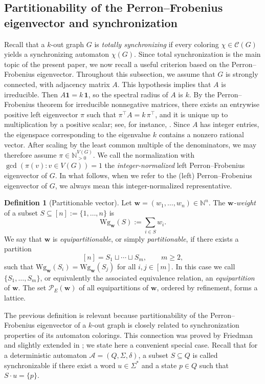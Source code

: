 \documentclass[a4paper,10pt]{amsart}
\theoremstyle{plain}
\theoremstyle{definition}
\newtheorem{definition}[theorem]{Definition}
\begin{document}
\subsection{Partitionability of the Perron--Frobenius eigenvector and synchronization}
Recall that a $k$-out graph $G$ is \emph{totally synchronizing} if every coloring $\chi\in\mathcal C(G)$ yields a synchronizing automaton $\chi(G)$. Since total synchronization is the main topic of the present paper, we now recall a useful criterion based on the Perron--Frobenius eigenvector. Throughout this subsection, we assume that $G$ is strongly connected, with adjacency matrix $A$. This hypothesis implies that $A$ is irreducible. Then $A\mathbf 1 = k\,\mathbf 1$, so the spectral radius of $A$ is $k$. By the Perron--Frobenius theorem for irreducible nonnegative matrices, there exists an entrywise positive left eigenvector $\pi$ such that $\pi^{\top}A = k\,\pi^{\top}$, and it is unique up to multiplication by a positive scalar; see, for instance, \cite{Seneta}. Since $A$ has integer entries, the eigenspace corresponding to the eigenvalue $k$ contains a nonzero rational vector. After scaling by the least common multiple of the denominators, we may therefore assume $\pi\in \mathbb N_{>0}^{V(G)}$. We call the normalization with $\gcd(\pi(v):v\in V(G))=1$ the \emph{integer-normalized} left Perron--Frobenius eigenvector of $G$. In what follows, when we refer to the (left) Perron--Frobenius eigenvector of $G$, we always mean this integer-normalized representative.

\begin{definition}[Partitionable vector]
Let $\mathbf w=(w_1,\dots,w_n)\in\mathbb N^n$. The \emph{$\mathbf w$-weight} of a subset $S\subseteq [n]:=\{1,\dots,n\}$ is
\[
\mathrm{Wg}_{\mathbf w}(S):=\sum_{i\in S} w_i.
\]
We say that $\mathbf w$ is \emph{equipartitionable}, or simply \emph{partitionable}, if there exists a partition
\[
[n]=S_1\sqcup\cdots\sqcup S_m,\qquad m\ge 2,
\]
such that $\mathrm{Wg}_{\mathbf w}(S_i)=\mathrm{Wg}_{\mathbf w}(S_j)$ for all $i,j\in [m]$. In this case we call $\{S_1,\dots,S_m\}$, or equivalently the associated equivalence relation, an \emph{equipartition} of $\mathbf w$. The set $\mathcal P_E(\mathbf w)$ of all equipartitions of $\mathbf w$, ordered by refinement, forms a lattice.
\end{definition}

The previous definition is relevant because partitionability of the Perron--Frobenius eigenvector of a $k$-out graph is closely related to synchronization properties of its automaton colorings. This connection was proved by Friedman~\cite{Fr1990} and slightly extended in \cite{GuPri}; we state here a convenient special case. Recall that for a deterministic automaton $\mathcal A=(Q,\Sigma,\delta)$, a subset $S\subseteq Q$ is called synchronizable if there exist a word $u\in\Sigma^*$ and a state $p\in Q$ such that $S\cdot u=\{p\}$.
\end{document}
